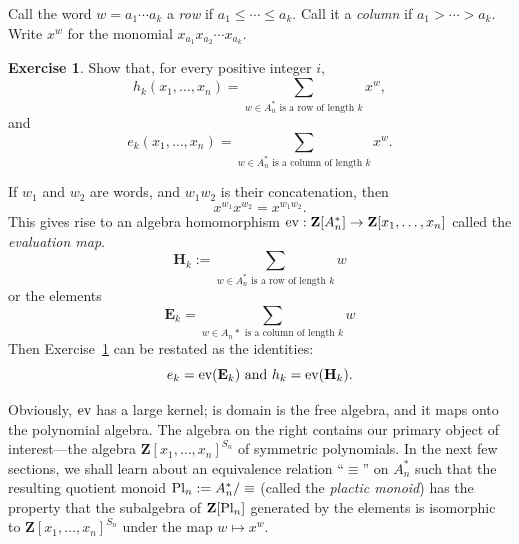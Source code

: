 \documentclass[11pt]{amsart}
\theoremstyle{definition}
\theoremstyle{example}
\newtheorem{exercise}[theorem]{Exercise}
\newcommand{\ev}{\textup{ev}}
\newcommand{\pl}{\textup{Pl}}
\begin{document}
Call the word $w=a_1\dotsb a_k$ a \emph{row} if $a_1\leq \dotsb \leq a_k$.
Call it a \emph{column} if $a_1>\dotsb>a_k$.
Write $x^w$ for the monomial $x_{a_1}x_{a_2}\dotsb x_{a_k}$.
\begin{exercise}
  \label{exercise:row-col}
  Show that, for every positive integer $i$,
  \begin{displaymath}
    h_k(x_1,\dotsc, x_n) = \sum_{\text{$w\in A_n^*$ is a row of length $k$}}x^w,
  \end{displaymath}
  and 
  \begin{displaymath}
    e_k(x_1,\dotsc, x_n) = \sum_{\text{$w\in A_n^*$ is a column of length $k$}}x^w.
  \end{displaymath}
\end{exercise}
If $w_1$ and $w_2$ are words, and $w_1w_2$ is their concatenation, then
\begin{displaymath}
  x^{w_1}x^{w_2} = x^{w_1w_2}.
\end{displaymath}
This gives rise to an algebra homomorphism $\ev:\mathbf Z[A_n^*]\to \mathbf Z[x_1,\dotsc, x_n]$ called the \emph{evaluation map}.
\begin{displaymath}
  \mathbf H_k := \sum_{\text{$w\in A_n^*$ is a row of length $k$}} w
\end{displaymath}
or the elements
\begin{displaymath}
  \mathbf E_k = \sum_{\text{$w\in A_n*$ is a column of length $k$}} w
\end{displaymath}
Then Exercise~\ref{exercise:row-col} can be restated as the identities:
\begin{displaymath}
  e_k = \ev(\mathbf E_k) \text{ and } h_k = \ev(\mathbf H_k).
\end{displaymath}

Obviously, $\ev$ has a large kernel; is domain is the free algebra, and it maps onto the polynomial algebra.
The algebra on the right contains our primary object of interest---the algebra $\mathbf Z[x_1,\dotsc,x_n]^{S_n}$ of symmetric polynomials.
In the next few sections, we shall learn about an equivalence relation ``$\equiv$'' on $A_n^*$ such that the resulting quotient monoid $\pl_n:=A_n^*/\equiv$ (called the \emph{plactic monoid}) has the property that the subalgebra of $\mathbf Z[\pl_n]$ generated by the elements
 is isomorphic to $\mathbf Z[x_1,\dotsc, x_n]^{S_n}$ under the map $w\mapsto x^w$.
\end{document}
